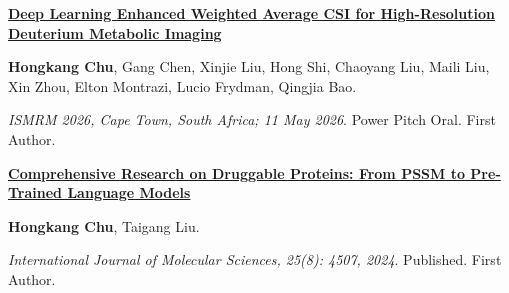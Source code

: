 \documentclass[10pt,letterpaper]{article}
\begin{document}
\begin{minipage}{\linewidth}
\small\textbf{\href{https://echo.ismrm.org/program/ISMRM2026/at-a-glance/session/616}{Deep Learning Enhanced Weighted Average CSI for High-Resolution Deuterium Metabolic Imaging}}\par
\textbf{Hongkang Chu}, Gang Chen, Xinjie Liu, Hong Shi, Chaoyang Liu, Maili Liu, Xin Zhou, Elton Montrazi, Lucio Frydman, Qingjia Bao.\par
\textit{ISMRM 2026, Cape Town, South Africa; 11 May 2026}. Power Pitch Oral. First Author.\end{minipage}\par\vspace{13pt}
\begin{minipage}{\linewidth}
\small\textbf{\href{https://doi.org/10.3390/ijms25084507}{Comprehensive Research on Druggable Proteins: From PSSM to Pre-Trained Language Models}}\par
\textbf{Hongkang Chu}, Taigang Liu.\par
\textit{International Journal of Molecular Sciences, 25(8): 4507, 2024}. Published. First Author.\end{minipage}\par\vspace{13pt}
\end{document}
